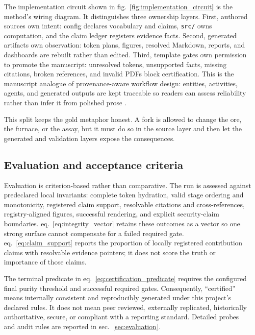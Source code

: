 \documentclass[
  english,
]{article}
\begin{document}
The implementation circuit shown in
fig.~\ref{fig:implementation_circuit} is the method's wiring diagram. It
distinguishes three ownership layers. First, authored sources own
intent: config declares vocabulary and claims, \texttt{src/} owns
computation, and the claim ledger registers evidence facts. Second,
generated artifacts own observation: token plans, figures, resolved
Markdown, reports, and dashboards are rebuilt rather than edited. Third,
template gates own permission to promote the manuscript: unresolved
tokens, unsupported facts, missing citations, broken references, and
invalid PDFs block certification. This is the manuscript analogue of
provenance-aware workflow design: entities, activities, agents, and
generated outputs are kept traceable so readers can assess reliability
rather than infer it from polished prose
\citep{moreau2013prov, belhajjame2015ontologies}.

This split keeps the gold metaphor honest. A fork is allowed to change
the ore, the furnace, or the assay, but it must do so in the source
layer and then let the generated and validation layers expose the
consequences.

\subsection{Evaluation and acceptance
criteria}\label{evaluation-and-acceptance-criteria}

Evaluation is criterion-based rather than comparative. The run is
assessed against predeclared local invariants: complete token hydration,
valid stage ordering and monotonicity, registered claim support,
resolvable citations and cross-references, registry-aligned figures,
successful rendering, and explicit security-claim boundaries.
eq.~\ref{eq:integrity_vector} retains these outcomes as a vector so one
strong surface cannot compensate for a failed required gate.
eq.~\ref{eq:claim_support} reports the proportion of locally registered
contribution claims with resolvable evidence pointers; it does not score
the truth or importance of those claims.

The terminal predicate in eq.~\ref{eq:certification_predicate} requires
the configured final purity threshold and successful required gates.
Consequently, ``certified'' means internally consistent and reproducibly
generated under this project's declared rules. It does not mean peer
reviewed, externally replicated, historically authoritative, secure, or
compliant with a reporting standard. Detailed probes and audit rules are
reported in sec.~\ref{sec:evaluation}.
\end{document}
